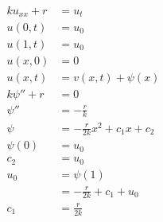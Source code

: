 \documentclass{article}
\begin{document}
\begin{align*}
  k u_{xx} + r & = u_t                                                                                                                                                   \\
  u(0, t)      & = u_0                                                                                                                                                   \\
  u(1, t)      & = u_0                                                                                                                                                   \\
  u(x, 0)      & = 0                                                                                                                                                     \\
  u(x, t)      & = v(x, t) + \psi(x)                                                                                                                                     \\
  k \psi'' + r & = 0                                                                                                                                                     \\
  \psi''       & = -\frac{r}{k}                                                                                                                                          \\
  \psi         & = -\frac{r}{2 k} x^2 + c_1 x + c_2                                                                                                                      \\
  \psi(0)      & = u_0                                                                                                                                                   \\
  c_2          & = u_0                                                                                                                                                   \\
  u_0          & = \psi(1)                                                                                                                                               \\
               & = -\frac{r}{2 k} + c_1 + u_0                                                                                                                            \\
  c_1          & = \frac{r}{2 k}                                                                                                                                         \\

\end{align*}
\end{document}
